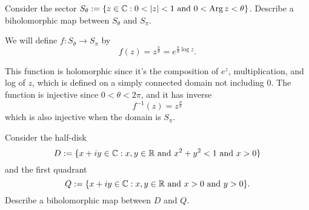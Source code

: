 \documentclass{homework}
\begin{document}
                                                                    \begin{problem}
                                                                      Consider the sector \(S_\theta := \{ z \in \mathbb{C} : 0 < |z| < 1 \mbox{ and } 0 < \operatorname{Arg} z < \theta \}\). Describe a biholomorphic map between $S_\theta$ and $S_\pi$.
                                                                      \end{problem}
                                                                      \begin{solution}
                                                                      We will define $f:S_\theta \to S_\pi$ by 
                                                                      $$f(z) = z^\frac{\pi}{\theta}  = e^{\frac{\pi}{\theta}\log z}.$$

                                                                      This function is holomorphic since it's the composition of $e^z$, multiplication, and log of $z$, which is defined on a simply connected domain not including 0. The function is injective since $0<\theta<2\pi$, and it has inverse 
                                                                      $$f^{-1}(z) = z^\frac{\theta}{\pi}$$
                                                                      which is also injective when the domain is $S_\pi$.
                                                                      \end{solution}
                                                                      \begin{problem}\label{halfdisktoquadrant}
                                                                        Consider the half-disk
                                                                          \[
                                                                              D := \{ x + iy \in \mathbb{C} : x, y \in \mathbb{R} \mbox{ and } x^2+y^2 < 1 \mbox{ and } x > 0 \}
                                                                                \]
                                                                                  and the first quadrant
                                                                                    \[
                                                                                        Q := \{ x + iy \in \mathbb{C} : x, y \in \mathbb{R} \mbox{ and } x > 0 \mbox{ and } y > 0 \}.
                                                                                          \]
                                                                                            Describe a biholomorphic map between $D$ and $Q$.
                                                                                            \end{problem}
\end{document}
